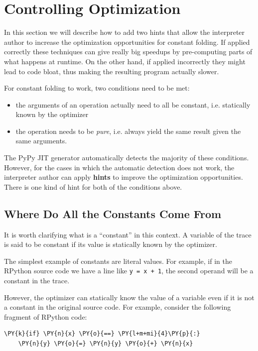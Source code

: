 \documentclass{sig-alternate}
\begin{document}



\section{Controlling Optimization}

In this section we will describe how to add two hints that allow the
interpreter author to increase the optimization opportunities for constant
folding. If applied correctly these techniques can give really big speedups by
pre-computing parts of what happens at runtime. On the other
hand, if applied incorrectly they might lead to code bloat, thus making the
resulting program actually slower.

For constant folding to work, two conditions need to be met:

\begin{itemize}
    \item the arguments of an operation actually need to all be constant,
    i.e. statically known by the optimizer
    \item the operation needs to be \emph{pure}, i.e. always yield the same result given
    the same arguments.
\end{itemize}

The PyPy JIT generator automatically detects the majority of these conditions.
However, for the cases in which the automatic detection does not work, the
interpreter author can apply \textbf{hints} to improve the optimization
opportunities. There is one kind of hint for both of the conditions above.


\subsection{Where Do All the Constants Come From}

It is worth clarifying what is a ``constant'' in this context.  A variable of
the trace is said to be constant if its value is statically known by the
optimizer.

The simplest example of constants are literal values.  For example, if in the
RPython source code we have a line like \texttt{y = x + 1}, the second operand will
be a constant in the trace.

However, the optimizer can statically know the value of a variable even if it
is not a constant in the original source code. For example, consider the
following fragment of RPython code:
\begin{Verbatim}[commandchars=\\\{\}]
\PY{k}{if} \PY{n}{x} \PY{o}{==} \PY{l+m+mi}{4}\PY{p}{:}
    \PY{n}{y} \PY{o}{=} \PY{n}{y} \PY{o}{+} \PY{n}{x}
\end{Verbatim}
\end{document}
